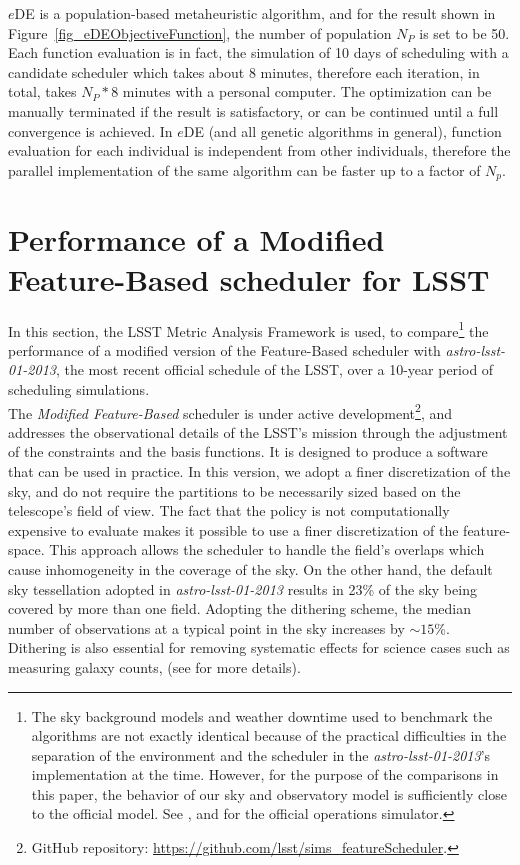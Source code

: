 \documentclass[12pt]{aastex62}
\theoremstyle{definition}
\begin{document}
$e$DE is a population-based metaheuristic algorithm, and for the result shown in Figure~\ref{fig_eDEObjectiveFunction}, the number of population $N_P$ is set to be 50. Each function evaluation is in fact, the simulation of 10 days of scheduling with a candidate scheduler which takes about 8 minutes, therefore each iteration, in total, takes $N_P * 8$ minutes with a personal computer. The optimization can be manually terminated if the result is satisfactory, or can be continued until a full convergence is achieved. In $e$DE (and all genetic algorithms in general), function evaluation for each individual is independent from other individuals, therefore the parallel implementation of the same algorithm can be faster up to a factor of $N_p$. 

 
\section{Performance of a Modified Feature-Based scheduler for LSST}\label{sec_comp}
In this section, the LSST Metric Analysis Framework \citep{jones2014lsst} is used, to compare\footnote{The sky background models and weather downtime used to benchmark the algorithms are not exactly identical because of the practical difficulties in the separation of the environment and the scheduler in the \textit{astro-lsst-01-2013}'s implementation at the time. However, for the purpose of the comparisons in this paper, the behavior of our sky and observatory model is sufficiently close to the official model. See \citep{2016SPIE.9910E..13D}, and \citep{2016SPIE.9911E..25R} for the official operations simulator.} the performance of a modified version of the Feature-Based scheduler with \textit{astro-lsst-01-2013}, the most recent official schedule of the LSST, over a 10-year period of scheduling simulations.\\
The \textit{Modified Feature-Based} scheduler is under active development\footnote{GitHub repository: \url{https://github.com/lsst/sims_featureScheduler}.}, and addresses the observational details of the LSST's mission through the adjustment of the constraints and the basis functions. It is designed to produce a software that can be used in practice. In this version, we adopt a finer discretization of the sky, and do not require the partitions to be necessarily sized based on the telescope's field of view. The fact that the policy is not computationally expensive to evaluate makes it possible to use a finer discretization of the feature-space. This approach allows the scheduler to handle the field's overlaps which cause inhomogeneity in the coverage of the sky. On the other hand, the default sky tessellation adopted in \textit{astro-lsst-01-2013} results in 23\% of the sky being covered by more than one field. Adopting the dithering scheme, the median number of observations at a typical point in the sky increases by $\sim15$\%. Dithering is also essential for removing systematic effects for science cases such as measuring galaxy counts, (see \citep{Awan2016} for more details).
\end{document}

